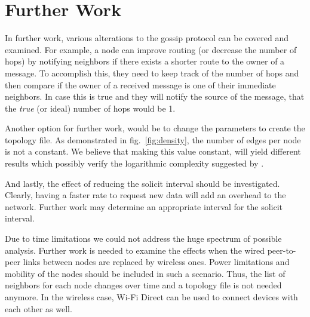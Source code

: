 \documentclass[12pt,journal]{IEEEtran}
\begin{document}
\section{Further Work}\label{sec:further}
In further work, various alterations to the gossip protocol can be covered and examined. For example, a node can improve routing (or decrease the number of hops) by notifying neighbors if there exists a shorter route to the owner of a message. To accomplish this, they need to keep track of the number of hops and then compare if the owner of a received message is one of their immediate neighbors. In case this is true and they will notify the source of the message, that the \textit{true} (or ideal) number of hops would be 1.

Another option for further work, would be to change the parameters to create the topology file. As demonstrated in fig.~\ref{fig:density}, the number of edges per node is not a constant. We believe that making this value constant, will yield different results which possibly verify the logarithmic complexity suggested by \cite{gossip}.

And lastly, the effect of reducing the solicit interval should be investigated. Clearly, having a faster rate to request new data will add an overhead to the network. Further work may determine an appropriate interval for the solicit interval.

Due to time limitations we could not address the huge spectrum of possible analysis. Further work is needed to examine the effects when the wired peer-to-peer links between nodes are replaced by wireless ones. Power limitations and mobility of the nodes should be included in such a scenario. Thus, the list of neighbors for each node changes over time and a topology file is not needed anymore. In the wireless case, Wi-Fi Direct can be used to connect devices with each other as well.




%
\end{document}
